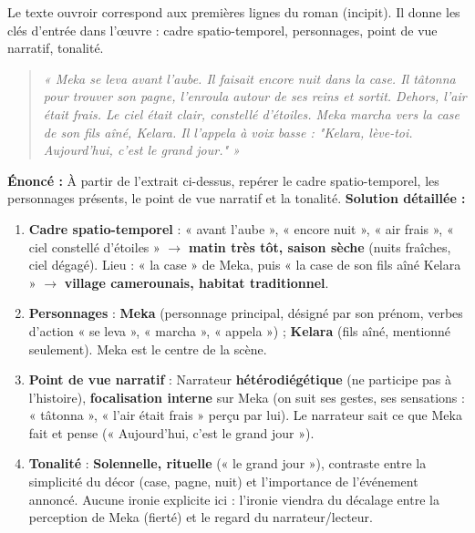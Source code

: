 \documentclass[11pt]{article}
\begin{document}
Le texte ouvroir correspond aux premières lignes du roman (incipit). Il donne les clés d'entrée dans l'œuvre : cadre spatio-temporel, personnages, point de vue narratif, tonalité.

\begin{exemplebox}
\begin{quote}
\emph{« Meka se leva avant l'aube. Il faisait encore nuit dans la case. Il tâtonna pour trouver son pagne, l'enroula autour de ses reins et sortit. Dehors, l'air était frais. Le ciel était clair, constellé d'étoiles. Meka marcha vers la case de son fils aîné, Kelara. Il l'appela à voix basse : "Kelara, lève-toi. Aujourd'hui, c'est le grand jour." »}
\end{quote}
\end{exemplebox}

\begin{exoresolu}
\textbf{Énoncé :} À partir de l'extrait ci-dessus, repérer le cadre spatio-temporel, les personnages présents, le point de vue narratif et la tonalité.
\tcblower
\textbf{Solution détaillée :}
\begin{enumerate}
\item \textbf{Cadre spatio-temporel} : « avant l'aube », « encore nuit », « air frais », « ciel constellé d'étoiles » $\rightarrow$ \textbf{matin très tôt, saison sèche} (nuits fraîches, ciel dégagé). Lieu : « la case » de Meka, puis « la case de son fils aîné Kelara » $\rightarrow$ \textbf{village camerounais, habitat traditionnel}.
\item \textbf{Personnages} : \textbf{Meka} (personnage principal, désigné par son prénom, verbes d'action « se leva », « marcha », « appela ») ; \textbf{Kelara} (fils aîné, mentionné seulement). Meka est le centre de la scène.
\item \textbf{Point de vue narratif} : Narrateur \textbf{hétérodiégétique} (ne participe pas à l'histoire), \textbf{focalisation interne} sur Meka (on suit ses gestes, ses sensations : « tâtonna », « l'air était frais » perçu par lui). Le narrateur sait ce que Meka fait et pense (« Aujourd'hui, c'est le grand jour »).
\item \textbf{Tonalité} : \textbf{Solennelle, rituelle} (« le grand jour »), contraste entre la simplicité du décor (case, pagne, nuit) et l'importance de l'événement annoncé. Aucune ironie explicite ici : l'ironie viendra du décalage entre la perception de Meka (fierté) et le regard du narrateur/lecteur.
\end{enumerate}
\end{exoresolu}
\end{document}
